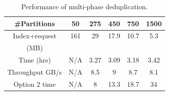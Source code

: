 
%


\begin{table}[hbt]
\caption{ Performance of multi-phase deduplication.}
\begin{center}
\begin{tabular} {|c|c|c|c|c|c|}
\hline \#Partitions  & 50 & 275  &450 &  750 &  1500 \\
\hline Index+request & 161&  29 & 17.9 & 10.7 & 5.3 \\
  (MB)           &  &   &  & &  \\

\hline Time (hrs) & N/A&  3.27 & 3.09 & 3.18 & 3.42 \\
\hline Throughput GB/s& N/A&  8.5& 9 & 8.7 & 8.1 \\
\hline Option 2 time & N/A&  8& 13.3 & 18.7 & 34 \\
\hline
\end{tabular}
\end{center}
\label{tab:overall}
\end{table}

%

